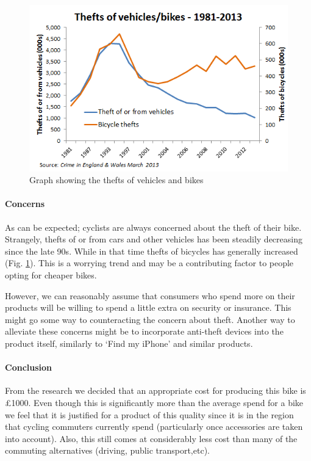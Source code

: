 \documentclass[a4paper]{report}
\begin{document}
\begin{figure}
\centering
\includegraphics[scale=0.8]{figures/cycle-theft}
\caption{Graph showing the thefts of vehicles and bikes \cite{ctc-stats}}
\label{fig:theft_graph}
\end{figure}
\paragraph{Concerns}
As can be expected; cyclists are always concerned about the theft of their bike. Strangely, thefts of or from cars and other vehicles has been steadily decreasing since the late 90s. While in that time thefts of bicycles has generally increased (Fig. \ref{fig:theft_graph}). This is a worrying trend and may be a contributing factor to people opting for cheaper bikes.

However, we can reasonably assume that consumers who spend more on their products will be  willing to spend a little extra on security or insurance. This might go some way to counteracting the concern about theft. Another way to alleviate these concerns might be to incorporate anti-theft devices into the product itself, similarly to ‘Find my iPhone’ and similar products.
\paragraph{Conclusion}
From the research we decided that an appropriate cost for producing this bike is \pounds1000. Even though this is significantly more than the average spend for a bike we feel that it is justified for a product of this quality since it is in the region that cycling commuters currently spend (particularly once accessories are taken into account). Also, this still comes at considerably less cost than many of the commuting alternatives (driving, public transport,etc).
\end{document}

